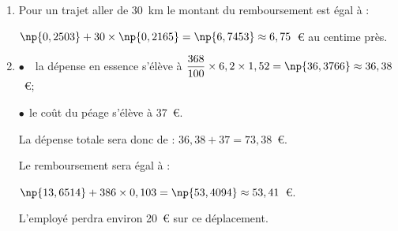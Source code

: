 \begin{enumerate}
\item %
Pour un \og trajet aller\fg{} de 30~km le montant du remboursement est égal à :

$\np{0,2503} + 30 \times \np{0,2165} = \np{6,7453} \approx 6,75$~\euro{} au centime près.
\item  %

$\bullet$~~la dépense en essence s'élève à $\dfrac{368}{100} \times 6,2 \times 1,52 = \np{36,3766} \approx 36,38$~\euro ;

$\bullet~~$le coût du péage s'élève à 37~\euro.

La dépense totale sera donc de : $36,38 + 37 = 73,38$~\euro.

Le remboursement sera égal à :

$\np{13,6514} + 386 \times 0,103 = \np{53,4094} \approx 53,41$~\euro. 

L'employé perdra environ 20~\euro{} sur ce déplacement.

%
\end{enumerate}

\vspace{0,5cm}

